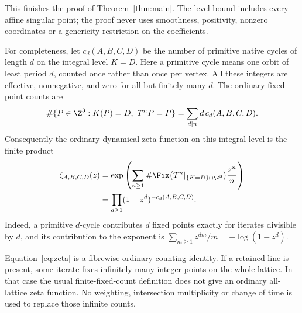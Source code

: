 This finishes the proof of Theorem~\ref{thm:main}. The level bound
includes every affine singular point; the proof never uses smoothness,
positivity, nonzero coordinates or a genericity restriction on the
coefficients.

For completeness, let \(c_d(A,B,C,D)\) be the number of primitive
native cycles of length \(d\) on the integral level \(K=D\).
Here a primitive cycle means one orbit of least period \(d\), counted
once rather than once per vertex. All these integers are effective,
nonnegative, and zero for all but finitely many \(d\). The ordinary
fixed-point counts are
\begin{equation}\label{eq:fixed_counts}
 \#\{P\in\Z^3:K(P)=D,\ T^nP=P\}
    =\sum_{d\mid n}d\,c_d(A,B,C,D).
\end{equation}
Consequently the ordinary dynamical zeta function on this integral
level is the finite product
\begin{equation}\label{eq:zeta}
 \begin{aligned}
 \zeta_{A,B,C,D}(z)
 &=\exp\left(\sum_{n\ge1}
   \#\Fix\bigl(T^n|_{\{K=D\}\cap\Z^3}\bigr)\frac{z^n}{n}\right)\\
 &=\prod_{d\ge1}(1-z^d)^{-c_d(A,B,C,D)}.
 \end{aligned}
\end{equation}
Indeed, a primitive \(d\)-cycle contributes \(d\) fixed points
exactly for iterates divisible by \(d\), and its contribution to the
exponent is \(\sum_{m\ge1}z^{dm}/m=-\log(1-z^d)\).

Equation~\eqref{eq:zeta} is a fibrewise ordinary counting identity.
If a retained line is present, some iterate fixes infinitely many
integer points on the whole lattice. In that case the usual
finite-fixed-count definition does not give an ordinary all-lattice
zeta function. No weighting, intersection multiplicity or change of
time is used to replace those infinite counts.
